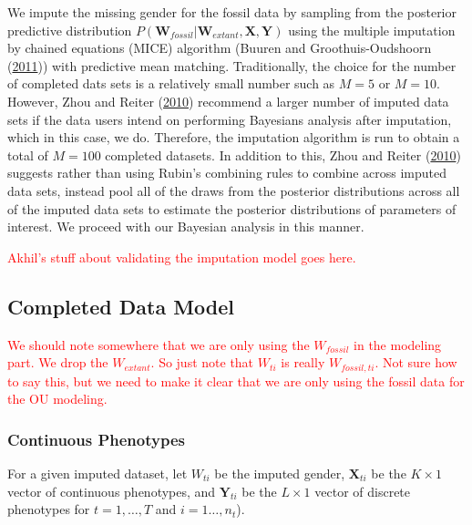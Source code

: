 \documentclass[
  12pt,
]{article}
\begin{document}
We impute the missing gender for the fossil data by sampling from the
posterior predictive distribution
\(P(\boldsymbol{W}_{fossil}|\boldsymbol{W}_{extant}, \boldsymbol{X}, \boldsymbol{Y})\)
using the multiple imputation by chained equations (MICE) algorithm
(Buuren and Groothuis-Oudshoorn (\protect\hyperlink{ref-MICE}{2011}))
with predictive mean matching. Traditionally, the choice for the number
of completed dats sets is a relatively small number such as \(M = 5\) or
\(M = 10\). However, Zhou and Reiter
(\protect\hyperlink{ref-ZhouReiter2009}{2010}) recommend a larger number
of imputed data sets if the data users intend on performing Bayesians
analysis after imputation, which in this case, we do. Therefore, the
imputation algorithm is run to obtain a total of \(M = 100\) completed
datasets. In addition to this, Zhou and Reiter
(\protect\hyperlink{ref-ZhouReiter2009}{2010}) suggests rather than
using Rubin's combining rules to combine across imputed data sets,
instead pool all of the draws from the posterior distributions across
all of the imputed data sets to estimate the posterior distributions of
parameters of interest. We proceed with our Bayesian analysis in this
manner.

\textcolor{red}{Akhil's stuff about validating the imputation model goes here.}

\hypertarget{completed-data-model}{%
\subsection{Completed Data Model}\label{completed-data-model}}

\textcolor{red}{We should note somewhere that we are only using the $W_{fossil}$ in the modeling part.  We drop the $W_{extant}$.  So just note that $W_{ti}$ is really $W_{fossil,ti}$.  Not sure how to say this, but we need to make it clear that we are only using the fossil data for the OU modeling.   }

\hypertarget{continuous-phenotypes}{%
\subsubsection{Continuous Phenotypes}\label{continuous-phenotypes}}

For a given imputed dataset, let \(W_{ti}\) be the imputed gender,
\(\boldsymbol{X}_{ti}\) be the \(K \times 1\) vector of continuous
phenotypes, and \(\boldsymbol{Y}_{ti}\) be the \(L \times 1\) vector of
discrete phenotypes for \(t = 1, \ldots, T\) and \(i = 1\ldots,n_{t}\)).
\end{document}
